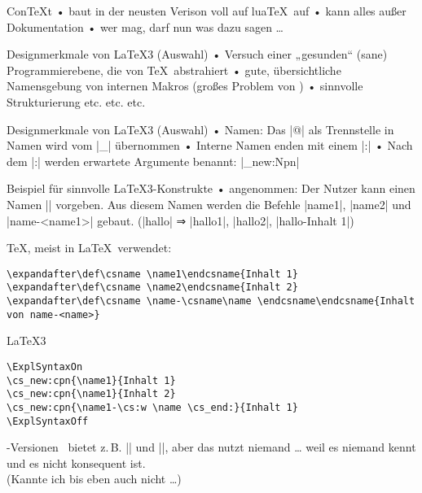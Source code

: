 \documentclass[t]{beamer}
\begin{document}
\begin{frame}{Con\TeX t}
• baut in der neusten Verison voll auf lua\TeX\ auf
• kann alles außer Dokumentation
• wer mag, darf nun was dazu sagen …
\•
\end{frame}

\begin{frame}{Designmerkmale von \LaTeX3 (Auswahl)}
• Versuch einer „gesunden“ (sane) Programmierebene, die von \TeX\ abstrahiert
• gute, übersichtliche Namensgebung von internen Makros (großes Problem von \LaTeXe)
• sinnvolle Strukturierung etc. etc. etc.
\•
\end{frame}

\begin{frame}[fragile]{Designmerkmale von \LaTeX3 (Auswahl)}
• Namen: Das |@| als Trennstelle in Namen wird vom |_| übernommen
• Interne Namen enden mit einem |:|
• Nach dem |:| werden erwartete Argumente benannt: |\cs_new:Npn|
\• 
\end{frame}

\begin{frame}[fragile]{Beispiel für sinnvolle \LaTeX3-Konstrukte}
• angenommen: Der Nutzer kann einen Namen |\name| vorgeben. Aus diesem Namen werden die Befehle |name1|, |name2| und |name-<name1>| gebaut. (|hallo| ⇒ |hallo1|, |hallo2|, |hallo-Inhalt 1|)
\•
\begin{block}{\TeX, meist in \LaTeX\ verwendet:}
\begin{verbatim}
\expandafter\def\csname \name1\endcsname{Inhalt 1}
\expandafter\def\csname \name2\endcsname{Inhalt 2}
\expandafter\def\csname \name-\csname\name \endcsname\endcsname{Inhalt von name-<name>}
\end{verbatim}
\end{block}

\begin{block}{\LaTeX3}
\begin{verbatim}
\ExplSyntaxOn
\cs_new:cpn{\name1}{Inhalt 1}
\cs_new:cpn{\name1}{Inhalt 2}
\cs_new:cpn{\name1-\cs:w \name \cs_end:}{Inhalt 1}
\ExplSyntaxOff
\end{verbatim}
\end{block}
\end{frame}

\begin{frame}{\LaTeXe-Versionen}
\LaTeXe\ bietet z.\,B. |\@nameuse| und |\@namedef|, aber das nutzt niemand … weil es niemand kennt und es nicht konsequent ist.\\
(Kannte ich bis eben auch nicht …)
\end{frame}
\end{document}
